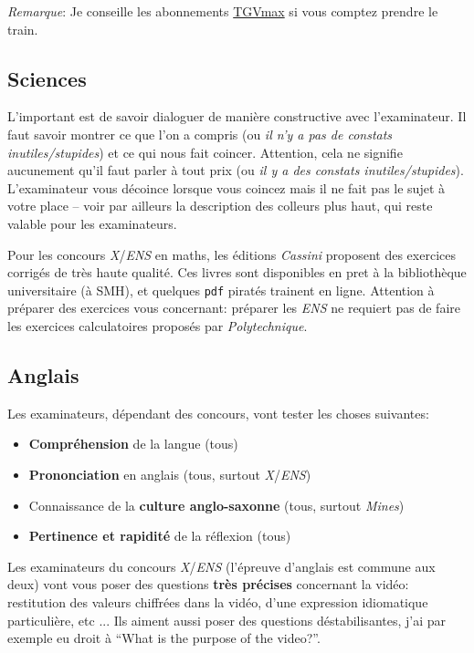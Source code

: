 \documentclass{article}
\begin{document}
\textit{Remarque}: Je conseille les abonnements \href{https://www.oui.sncf/bons-plans/tgvmax}{TGVmax} si vous comptez prendre le train.

\subsection{Sciences}
L'important est de savoir dialoguer de manière constructive avec l'examinateur.
Il faut savoir montrer ce que l'on a compris (ou \textit{il n'y a pas de constats inutiles/stupides}) et ce qui nous fait coincer.
Attention, cela ne signifie aucunement qu'il faut parler à tout prix (ou \textit{il y a des constats inutiles/stupides}).
L'examinateur vous décoince lorsque vous coincez mais il ne fait pas le sujet à votre place -- voir par ailleurs la description des colleurs plus haut, qui reste valable pour les examinateurs.

Pour les concours \textit{X}/\textit{ENS} en maths, les éditions \textit{Cassini} proposent des exercices corrigés de très haute qualité.
Ces livres sont disponibles en pret à la bibliothèque universitaire (à SMH), et quelques \texttt{pdf} piratés trainent en ligne.
Attention à préparer des exercices vous concernant: préparer les \textit{ENS} ne requiert pas de faire les exercices calculatoires proposés par \textit{Polytechnique}.

\subsection{Anglais}
Les examinateurs, dépendant des concours, vont tester les choses suivantes:


\begin{itemize}
\item  \textbf{Compréhension} de la langue (tous)
\item  \textbf{Prononciation} en anglais (tous, surtout \textit{X}/\textit{ENS})
\item  Connaissance de la \textbf{culture anglo-saxonne} (tous, surtout \textit{Mines})
\item  \textbf{Pertinence et rapidité} de la réflexion (tous)

\end{itemize}

Les examinateurs du concours \textit{X}/\textit{ENS} (l'épreuve d'anglais est commune aux deux) vont vous poser des questions \textbf{très précises} concernant la vidéo: restitution des valeurs chiffrées dans la vidéo, d'une expression idiomatique particulière, etc ...
Ils aiment aussi poser des questions déstabilisantes, j'ai par exemple eu droit à ``What is the purpose of the video?''.
\end{document}
